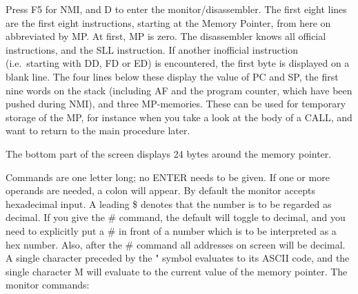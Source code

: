     Press F5 for NMI, and D to enter the monitor/disassembler.  The first
    eight lines are the first eight instructions, starting at the Memory
    Pointer, from here on abbreviated by MP\@.  At first, MP is zero.  The
    disassembler knows all official instructions, and the SLL instruction.
    If another inofficial instruction (i.e.\  starting with DD, FD or ED) is
    encountered, the first byte is displayed on a blank line.  The four
    lines below these display the value of PC and SP, the first nine words
    on the stack (including AF and the program counter, which have been
    pushed during NMI), and three MP-memories.  These can be used for
    temporary storage of the MP, for instance when you take a look at the
    body of a CALL, and want to return to the main procedure later.

    The bottom part of the screen displays 24 bytes around the memory
    pointer.

    Commands are one letter long; no ENTER needs to be given.  If one or
    more operands are needed, a colon will appear.  By default the monitor
    accepts hexadecimal input.  A leading \$ denotes that the number is to be
    regarded as decimal.  If you give the \# command, the default will toggle
    to decimal, and you need to explicitly put a \# in front of a number
    which is to be interpreted as a hex number.  Also, after the \# command
    all addresses on screen will be decimal.  A single character preceded by
    the " symbol evaluates to its ASCII code, and the single character M
    will evaluate to the current value of the memory pointer.
\noindent
    The monitor commands:

